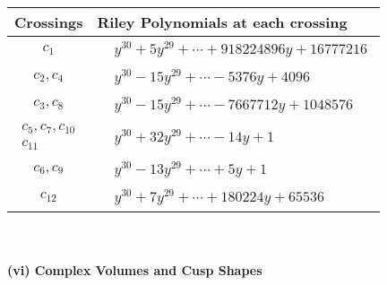 \documentclass[1p]{elsarticle_modified}
\theoremstyle{definition}
\begin{document}
\begin{tabular}{m{50pt}|m{274pt}}
Crossings & \hspace{64pt}Riley Polynomials at each crossing \\
\hline $$\begin{aligned}c_{1}\end{aligned}$$&$\begin{aligned}
&y^{30}+5 y^{29}+\cdots+918224896 y+16777216
\end{aligned}$\\
\hline $$\begin{aligned}c_{2},c_{4}\end{aligned}$$&$\begin{aligned}
&y^{30}-15 y^{29}+\cdots-5376 y+4096
\end{aligned}$\\
\hline $$\begin{aligned}c_{3},c_{8}\end{aligned}$$&$\begin{aligned}
&y^{30}-15 y^{29}+\cdots-7667712 y+1048576
\end{aligned}$\\
\hline $$\begin{aligned}c_{5},c_{7},c_{10}\\c_{11}\end{aligned}$$&$\begin{aligned}
&y^{30}+32 y^{29}+\cdots-14 y+1
\end{aligned}$\\
\hline $$\begin{aligned}c_{6},c_{9}\end{aligned}$$&$\begin{aligned}
&y^{30}-13 y^{29}+\cdots+5 y+1
\end{aligned}$\\
\hline $$\begin{aligned}c_{12}\end{aligned}$$&$\begin{aligned}
&y^{30}+7 y^{29}+\cdots+180224 y+65536
\end{aligned}$\\
\hline
\end{tabular}\\~\\
\newpage\flushleft \textbf{(vi) Complex Volumes and Cusp Shapes}
\end{document}
